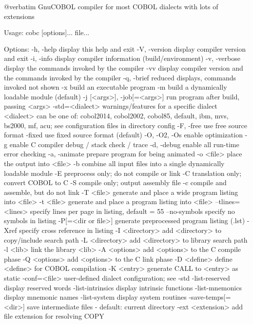 @verbatim
GnuCOBOL compiler for most COBOL dialects with lots of extensions

Usage: cobc [options]... file...

Options:
  -h, -help             display this help and exit
  -V, -version          display compiler version and exit
  -i, -info             display compiler information (build/environment)
  -v, -verbose          display the commands invoked by the compiler
  -vv                   display compiler version and the commands
                        invoked by the compiler
  -q, -brief            reduced displays, commands invoked not shown
  -x                    build an executable program
  -m                    build a dynamically loadable module (default)
  -j [<args>], -job[=<args>]	run program after build, passing <args>
  -std=<dialect>        warnings/features for a specific dialect
                        <dialect> can be one of:
                        cobol2014, cobol2002, cobol85, default,
                        ibm, mvs, bs2000, mf, acu;
                        see configuration files in directory config
  -F, -free             use free source format
  -fixed                use fixed source format (default)
  -O, -O2, -Os          enable optimization
  -g                    enable C compiler debug / stack check / trace
  -d, -debug            enable all run-time error checking
  -a, -animate          prepare program for being animated
  -o <file>             place the output into <file>
  -b                    combine all input files into a single
                        dynamically loadable module
  -E                    preprocess only; do not compile or link
  -C                    translation only; convert COBOL to C
  -S                    compile only; output assembly file
  -c                    compile and assemble, but do not link
  -T <file>             generate and place a wide program listing into <file>
  -t <file>             generate and place a program listing into <file>
  --tlines=<lines>      specify lines per page in listing, default = 55
  --no-symbols          specify no symbols in listing
  -P[=<dir or file>]    generate preprocessed program listing (.lst)
  -Xref                 specify cross reference in listing
  -I <directory>        add <directory> to copy/include search path
  -L <directory>        add <directory> to library search path
  -l <lib>              link the library <lib>
  -A <options>          add <options> to the C compile phase
  -Q <options>          add <options> to the C link phase
  -D <define>           define <define> for COBOL compilation
  -K <entry>            generate CALL to <entry> as static
  -conf=<file>          user-defined dialect configuration; see -std
  -list-reserved        display reserved words
  -list-intrinsics      display intrinsic functions
  -list-mnemonics       display mnemonic names
  -list-system          display system routines
  -save-temps[=<dir>]   save intermediate files
                        - default: current directory
  -ext <extension>      add file extension for resolving COPY

